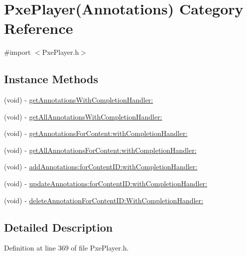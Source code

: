 \hypertarget{category_pxe_player_07_annotations_08}{\section{Pxe\-Player(Annotations) Category Reference}
\label{category_pxe_player_07_annotations_08}
}


{\ttfamily \#import $<$Pxe\-Player.\-h$>$}

\subsection*{Instance Methods}
\begin{DoxyCompactItemize}
\item 
(void) -\/ \hyperlink{category_pxe_player_07_annotations_08_af77b76a936a039550119cb381f6fadaa}{get\-Annotations\-With\-Completion\-Handler\-:}
\item 
(void) -\/ \hyperlink{category_pxe_player_07_annotations_08_adc782f450891626f9a8a643e86ea4b63}{get\-All\-Annotations\-With\-Completion\-Handler\-:}
\item 
(void) -\/ \hyperlink{category_pxe_player_07_annotations_08_a0b8a6759a8033cd36d53ee9f2c942dbd}{get\-Annotations\-For\-Content\-:with\-Completion\-Handler\-:}
\item 
(void) -\/ \hyperlink{category_pxe_player_07_annotations_08_ab9277ba9cb562ee39249fcd4aec564e3}{get\-All\-Annotations\-For\-Content\-:with\-Completion\-Handler\-:}
\item 
(void) -\/ \hyperlink{category_pxe_player_07_annotations_08_ab9fa27896dac76e5fbd93c33f11c6593}{add\-Annotations\-:for\-Content\-I\-D\-:with\-Completion\-Handler\-:}
\item 
(void) -\/ \hyperlink{category_pxe_player_07_annotations_08_a64c8f18a69509f87d7b68edd5c180ba6}{update\-Annotations\-:for\-Content\-I\-D\-:with\-Completion\-Handler\-:}
\item 
(void) -\/ \hyperlink{category_pxe_player_07_annotations_08_a68b66342678e553a27733485471d00de}{delete\-Annotation\-For\-Content\-I\-D\-:\-With\-Completion\-Handler\-:}
\end{DoxyCompactItemize}


\subsection{Detailed Description}


Definition at line 369 of file Pxe\-Player.\-h.



